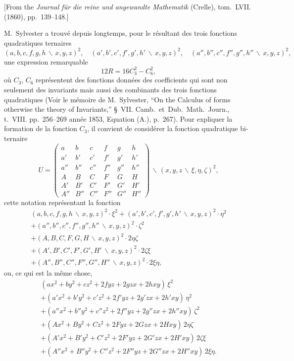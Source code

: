 \documentclass[11pt,a4paper]{book}
\begin{document}
[From the \textit{Journal f\"{u}r die reine und angewandte Mathematik} (Crelle),
tom.~LVII. (1860), pp.~139--148.]
\vspace{0.5em}

M.~Sylvester a trouv\'{e} depuis longtemps, pour le r\'{e}sultant des trois fonctions
quadratiques ternaires
\[
(a,b,c,f,g,h\,\backslash\!\!\,x,y,z)^{2},\quad
(a',b',c',f',g',h'\,\backslash\!\!\,x,y,z)^{2},\quad
(a'',b'',c'',f'',g'',h''\,\backslash\!\!\,x,y,z)^{2},
\]
une expression remarquable
\[12R = 16C_{3}^{2} - C_{6}^{2},\]
o\`{u} $C_{3}$, $C_{6}$ repr\'{e}sentent des fonctions donn\'{e}es des coefficients qui sont
non seulement des invariants mais aussi des combinants des trois fonctions quadratiques
(Voir le m\'{e}moire de M.~Sylvester, ``On the Calculus of forms otherwise the theory
of Invariants,'' \S~VII. Camb.~et~Dub.~Math.~Journ., t.~VIII. pp.~256--269 ann\'{e}e 1853,
Equation (A.), p.~267). Pour expliquer la formation de la fonction $C_{3}$, il convient
de consid\'{e}rer la fonction quadratique bi-ternaire
\[
U = \begin{pmatrix}
a & b & c & f & g & h \\
a' & b' & c' & f' & g' & h' \\
a'' & b'' & c'' & f'' & g'' & h'' \\
A & B & C & F & G & H \\
A' & B' & C' & F' & G' & H' \\
A'' & B'' & C'' & F'' & G'' & H''
\end{pmatrix}\!\!\,\backslash\!\!\,(x,y,z\,\backslash\!\!\,\xi,\eta,\zeta)^{2},
\]
cette notation repr\'{e}sentant la fonction
\begin{multline*}
(a,b,c,f,g,h\,\backslash\!\!\,x,y,z)^{2}\cdot\xi^{2}
+ (a',b',c',f',g',h'\,\backslash\!\!\,x,y,z)^{2}\cdot\eta^{2} \\
+ (a'',b'',c'',f'',g'',h''\,\backslash\!\!\,x,y,z)^{2}\cdot\zeta^{2} \\
+ (A,B,C,F,G,H\,\backslash\!\!\,x,y,z)^{2}\cdot2\eta\zeta \\
+ (A',B',C',F',G',H'\,\backslash\!\!\,x,y,z)^{2}\cdot2\zeta\xi \\
+ (A'',B'',C'',F'',G'',H''\,\backslash\!\!\,x,y,z)^{2}\cdot2\xi\eta,
\end{multline*}
ou, ce qui est la m\^{e}me chose,
\begin{multline*}
(ax^{2}+by^{2}+cz^{2}+2fyz+2gzx+2hxy)\,\xi^{2} \\
+ (a'x^{2}+b'y^{2}+c'z^{2}+2f'yz+2g'zx+2h'xy)\,\eta^{2} \\
+ (a''x^{2}+b''y^{2}+c''z^{2}+2f''yz+2g''zx+2h''xy)\,\zeta^{2} \\
+ (Ax^{2}+By^{2}+Cz^{2}+2Fyz+2Gzx+2Hxy)\,2\eta\zeta \\
+ (A'x^{2}+B'y^{2}+C'z^{2}+2F'yz+2G'zx+2H'xy)\,2\zeta\xi \\
+ (A''x^{2}+B''y^{2}+C''z^{2}+2F''yz+2G''zx+2H''xy)\,2\xi\eta.
\end{multline*}
\end{document}

